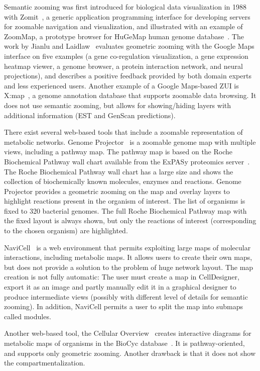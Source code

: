 \documentclass{bmcart}
\begin{document}
Semantic zooming was first introduced for biological data visualization in 1988 with Zomit~\cite{Pook1998}, a generic application programming interface for developing  servers for zoomable navigation and visualization, and illustrated with an example of ZoomMap, a prototype browser for HuGeMap human genome database~\cite{Barillot1998}. The work by Jianlu and Laidlaw~\cite{Jianu2013} evaluates geometric zooming with the Google Maps interface on five examples (a gene co-regulation visualization, a gene expression heatmap viewer, a genome browser, a protein interaction network, and  neural projections), and describes a positive feedback provided by both domain experts and less experienced users. Another example of a Google Maps-based ZUI is X:map~\cite{Yates2008}, a genome annotation database that supports zoomable data browsing. It does not use semantic zooming, but allows for showing/hiding layers with additional information (EST and GenScan predictions).

There exist several web-based tools that include a zoomable representation of metabolic networks. Genome Projector~\cite{Arakawa2009} is a zoomable genome map with multiple views, including a pathway map. The pathway map is based on the Roche Biochemical Pathway wall chart available from the ExPASy proteomics server~\cite{Gasteiger2003}. The Roche Biochemical Pathway wall chart has a large size and shows the collection of biochemically known molecules, enzymes and reactions. Genome Projector provides a geometric zooming on the map and overlay layers to highlight reactions present in the organism of interest. The list of organisms is fixed to 320 bacterial genomes. The full Roche Biochemical Pathway map with the fixed layout is always shown, but only the reactions of interest (corresponding to the chosen organism) are highlighted.

NaviCell~\cite{Kuperstein2013} is a web environment that permits exploiting large maps of molecular interactions, including metabolic maps. It allows users to create their own maps, but does not provide a solution to the problem of huge network layout. The map creation is not fully automatic: The user must create a map in CellDesigner, export it as an image and partly manually edit it in a graphical designer to produce intermediate views (possibly with different level of details for semantic zooming). In addition, NaviCell permits a user to split the map into submaps called modules.

Another web-based tool, the Cellular Overview~\cite{Latendresse2011} creates interactive diagrams for metabolic maps of organisms in the BioCyc database~\cite{Caspi2012}. It is pathway-oriented, and supports only geometric zooming. Another drawback is that it does not show the compartmentalization.
\end{document}
